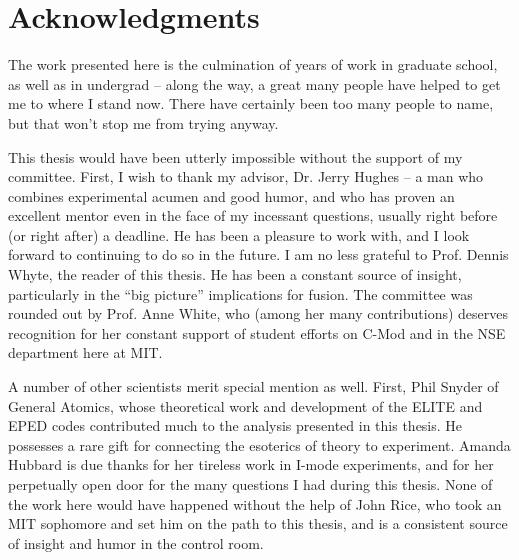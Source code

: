 
\chapter*{Acknowledgments}

The work presented here is the culmination of years of work in graduate school, as well as in undergrad -- along the way, a great many people have helped to get me to where I stand now.  There have certainly been too many people to name, but that won't stop me from trying anyway.

This thesis would have been utterly impossible without the support of my committee.  First, I wish to thank my advisor, Dr. Jerry Hughes -- a man who combines experimental acumen and good humor, and who has proven an excellent mentor even in the face of my incessant questions, usually right before (or right after) a deadline.  He has been a pleasure to work with, and I look forward to continuing to do so in the future.  I am no less grateful to Prof. Dennis Whyte, the reader of this thesis.  He has been a constant source of insight, particularly in the ``big picture'' implications for fusion.  The committee was rounded out by Prof. Anne White, who (among her many contributions) deserves recognition for her constant support of student efforts on C-Mod and in the NSE department here at MIT.

A number of other scientists merit special mention as well.  First, Phil Snyder of General Atomics, whose theoretical work and development of the ELITE and EPED codes contributed much to the analysis presented in this thesis.  He possesses a rare gift for connecting the esoterics of theory to experiment.  Amanda Hubbard is due thanks for her tireless work in I-mode experiments, and for her perpetually open door for the many questions I had during this thesis.  None of the work here would have happened without the help of John Rice, who took an MIT sophomore and set him on the path to this thesis, and is a consistent source of insight and humor in the control room.

